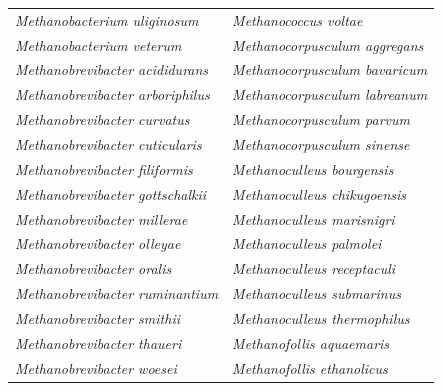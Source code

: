 \documentclass[fontsize=12pt,headsepline=true, bibliography=totocnumbered, twoside]{scrbook} %
\begin{document}
\begin{table}[h]
\begin{tabular}{ll}
\textit{Methanobacterium uliginosum}     & \textit{Methanococcus voltae}            \\
\textit{Methanobacterium veterum}        & \textit{Methanocorpusculum aggregans}    \\
\textit{Methanobrevibacter acididurans}  & \textit{Methanocorpusculum bavaricum}    \\
\textit{Methanobrevibacter arboriphilus} & \textit{Methanocorpusculum labreanum}    \\
\textit{Methanobrevibacter curvatus}     & \textit{Methanocorpusculum parvum}       \\
\textit{Methanobrevibacter cuticularis}  & \textit{Methanocorpusculum sinense}      \\
\textit{Methanobrevibacter filiformis}   & \textit{Methanoculleus bourgensis}       \\
\textit{Methanobrevibacter gottschalkii} & \textit{Methanoculleus chikugoensis}     \\
\textit{Methanobrevibacter millerae}     & \textit{Methanoculleus marisnigri}       \\
\textit{Methanobrevibacter olleyae}      & \textit{Methanoculleus palmolei}         \\
\textit{Methanobrevibacter oralis}       & \textit{Methanoculleus receptaculi}      \\
\textit{Methanobrevibacter ruminantium}  & \textit{Methanoculleus submarinus}       \\
\textit{Methanobrevibacter smithii}      & \textit{Methanoculleus thermophilus}     \\
\textit{Methanobrevibacter thaueri}      & \textit{Methanofollis aquaemaris}        \\
\textit{Methanobrevibacter woesei}       & \textit{Methanofollis ethanolicus}      
\end{tabular}
\end{table}
\end{document}
